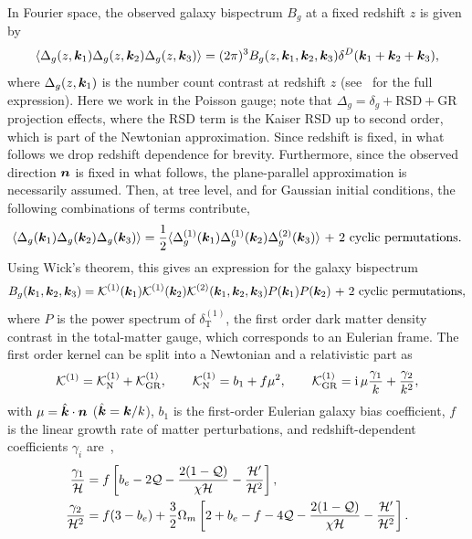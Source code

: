 In Fourier space, the observed galaxy bispectrum \(B_g\) at a fixed redshift \(z\) is given by~\cite{Jolicoeur:2017nyt,Jolicoeur:2017eyi}
\begin{equation}
	\langle \Delta_g(z,\bm {k}_1) \Delta_g(z,\bm {k}_2) \Delta_g(z,\bm {k}_3) \rangle = (2\pi)^3 B_g(z,\bm {k}_1,\bm {k}_2,\bm {k}_3) \delta^D(\bm {k}_1+\bm {k}_2+\bm {k}_3),
\end{equation}
where \(\Delta_g(z, \bm {k}_1)\) is the number count contrast at redshift \(z\) (see~\cite{Jolicoeur:2017nyt} for the full expression). Here we work in the Poisson gauge; note that \(\Delta_g = \delta_g + \text{RSD}+\text{GR}\) projection effects, where the RSD term is the Kaiser RSD up to second order, which is part of the Newtonian approximation. Since redshift is fixed, in what follows we drop redshift dependence for brevity. Furthermore, since the observed direction \(\bm {n}\) is fixed in what follows, the plane-parallel approximation is necessarily assumed. Then, at tree level, and for Gaussian initial conditions, the following combinations of terms contribute, 
\begin{equation}
\langle \Delta_g(\bm {k}_1)\Delta_g(\bm {k}_2)\Delta_g(\bm {k}_3) \rangle = \frac{1}{2} \langle \Delta_g^{(1)}(\bm {k}_1)\Delta_g^{(1)}(\bm {k}_2)\Delta_g^{(2)}(\bm {k}_3)\rangle \text{ + 2 cyclic permutations.}
\end{equation}
Using Wick's theorem, this gives an expression for the galaxy bispectrum ~\cite{Jolicoeur:2017nyt}
\begin{equation}
B_g(\bm {k}_1, \bm {k}_2,\bm {k}_3)= \mathcal{K}^{(1)}(\bm {k}_1) \mathcal{K}^{(1)}(\bm {k}_2) \mathcal{K}^{(2)}(\bm {k}_1,\bm {k}_2,\bm {k}_3)P(\bm {k}_1) P(\bm {k}_2)\text{ + 2 cyclic permutations},
\end{equation}
where \(P\) is the power spectrum of \(\delta_\mathrm{T}^{(1)}\), the first order dark matter density contrast in the total-matter gauge, which corresponds to an Eulerian frame. The first order kernel can be split into a Newtonian and a relativistic part as~\cite{Jeong:2011as}
\begin{equation}
\mathcal{K}^{(1)} = \mathcal{K}^{(1)}_\mathrm{N} + \mathcal{K}^{(1)}_\mathrm{GR}, \qquad \mathcal{K}^{(1)}_\mathrm{N}= b_1 + f \mu^2, \qquad \mathcal{K}^{(1)}_\mathrm{GR} = \mathrm{i\,} \mu \frac{\gamma_1}{k} + \frac{\gamma_2}{k^2}, 
\end{equation}
with \(\mu = \hat{\bm {k}} \cdot \bm {n} \) (\(\hat{\bm {k}} = \bm {k}/k\)), \(b_1\) is the first-order Eulerian galaxy bias coefficient, \(f\) is the linear growth rate of matter perturbations, and redshift-dependent coefficients \(\gamma_i\) are~\cite{Jeong:2011as},
\begin{align}\label{eq:gamma1def}
\frac{\gamma_1}{\mathcal{H}} &= f \left[ b_e - 2 \mathcal{Q} - \frac{2(1-\mathcal{Q})}{\chi \mathcal{H}} - \frac{\mathcal{H}'}{\mathcal{H}^2}\right], \\
\frac{\gamma_2}{\mathcal{H}^2} &= f(3-b_e) + \frac{3}{2} \Omega_m \left[ 2+ b_e - f - 4\mathcal{Q} - \frac{2(1-\mathcal{Q})}{\chi\mathcal{H}} - \frac{\mathcal{H}'}{\mathcal{H}^2} \right].\label{eq:gamma2def}
\end{align}
